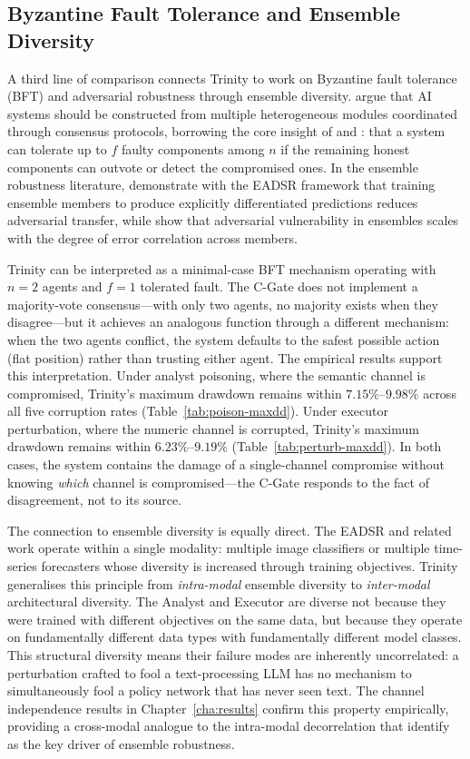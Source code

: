 \subsection{Byzantine Fault Tolerance and Ensemble Diversity}
\label{sec:disc-bft-ensemble}

A third line of comparison connects Trinity to work on Byzantine fault
tolerance (BFT) and adversarial robustness through ensemble diversity.
\cite{devadoss_byzantine_2025} argue that AI systems should be constructed from
multiple heterogeneous modules coordinated through consensus protocols,
borrowing the core insight of \cite{lamport1982byzantine} and
\cite{castro1999pbft}: that a system can tolerate up to $f$ faulty components
among $n$ if the remaining honest components can outvote or detect the
compromised ones. In the ensemble robustness literature,
\cite{chen_diversity_2024-1} demonstrate with the EADSR framework that
training ensemble members to produce explicitly differentiated predictions
reduces adversarial transfer, while \cite{pang_improving_2019} show that
adversarial vulnerability in ensembles scales with the degree of error
correlation across members.

Trinity can be interpreted as a minimal-case BFT mechanism operating with
$n = 2$ agents and $f = 1$ tolerated fault. The C-Gate does not implement a
majority-vote consensus---with only two agents, no majority exists when they
disagree---but it achieves an analogous function through a different mechanism:
when the two agents conflict, the system defaults to the safest possible
action (flat position) rather than trusting either agent. The empirical
results support this interpretation. Under analyst poisoning, where the
semantic channel is compromised, Trinity's maximum drawdown remains within
$7.15\%$--$9.98\%$ across all five corruption rates
(Table~\ref{tab:poison-maxdd}). Under executor perturbation, where the
numeric channel is corrupted, Trinity's maximum drawdown remains within
$6.23\%$--$9.19\%$ (Table~\ref{tab:perturb-maxdd}). In both cases, the
system contains the damage of a single-channel compromise without knowing
\emph{which} channel is compromised---the C-Gate responds to the fact of
disagreement, not to its source.

The connection to ensemble diversity is equally direct. The EADSR and related
work operate within a single modality: multiple image classifiers or multiple
time-series forecasters whose diversity is increased through training
objectives. Trinity generalises this principle from \emph{intra-modal} ensemble
diversity to \emph{inter-modal} architectural diversity. The Analyst and
Executor are diverse not because they were trained with different
objectives on the same data, but because they operate on fundamentally
different data types with fundamentally different model classes. This
structural diversity means their failure modes are inherently uncorrelated:
a perturbation crafted to fool a text-processing LLM has no mechanism to
simultaneously fool a policy network that has never seen text. The channel
independence results in Chapter~\ref{cha:results} confirm this property
empirically, providing a cross-modal analogue to the intra-modal decorrelation
that \cite{pang_improving_2019} identify as the key driver of ensemble
robustness.

